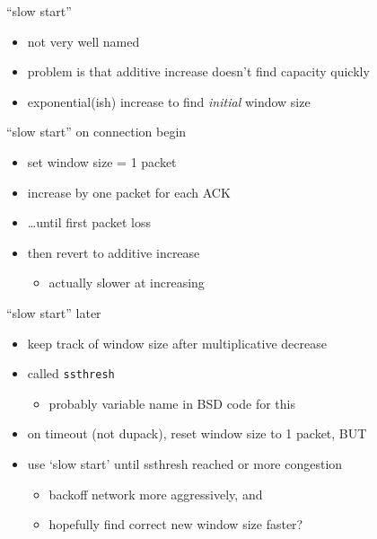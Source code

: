 \begin{frame}{``slow start''}
    \begin{itemize}
    \item not very well named
    \vspace{.5cm}
    \item problem is that additive increase doesn't find capacity quickly
    \item exponential(ish) increase to find \textit{initial} window size
    \end{itemize}
\end{frame}

\begin{frame}{``slow start'' on connection begin}
    \begin{itemize}
    \item set window size = 1 packet
    \item increase by one packet for each ACK
    \item \ldots until first packet loss
    \vspace{.5cm}
    \item then revert to additive increase
        \begin{itemize}
        \item actually slower at increasing
        \end{itemize}
    \end{itemize}
\end{frame}

\begin{frame}{``slow start'' later}
    \begin{itemize}
    \item keep track of window size after multiplicative decrease
    \item called \texttt{ssthresh}
        \begin{itemize}
        \item probably variable name in BSD code for this
        \end{itemize}
    \vspace{.5cm}
    \item on timeout (not dupack), reset window size to 1 packet, BUT
    \item use `slow start' until ssthresh reached or more congestion
        \begin{itemize}
        \item backoff network more aggressively, and
        \item hopefully find correct new window size faster?
        \end{itemize}
    \end{itemize}
\end{frame}
